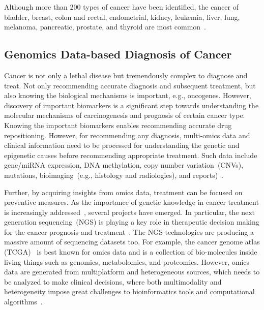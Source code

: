 \hspace*{3.5mm} Although more than 200 types of cancer have been identified, the cancer of bladder, breast, colon and rectal, endometrial, kidney, leukemia, liver, lung, melanoma, pancreatic, prostate, and thyroid are most common~\cite{71Torre}. 

\subsection{Genomics Data-based Diagnosis of Cancer}
\hspace*{3.5mm} Cancer is not only a lethal disease but tremendously complex to diagnose and treat. Not only recommending accurate diagnosis and subsequent treatment, but also knowing the biological mechanisms is important, e.g., oncogenes. However, discovery of important biomarkers is a significant step towards understanding the molecular mechanisms of carcinogenesis and prognosis of certain cancer type. Knowing the important biomarkers enables recommending accurate drug repositioning. However, for recommending any diagnosis, multi-omics data and clinical information need to be processed for understanding the genetic and epigenetic causes before recommending appropriate treatment. Such data include gene/miRNA expression, DNA methylation, copy number variation~(CNVs), mutations, bioimaging~(e.g., histology and radiologies), and reports)~\cite{22Ding, 23Zheng}.  

\hspace*{3.5mm} Further, by acquiring insights from omics data, treatment can be focused on preventive measures. As the importance of genetic knowledge in cancer treatment is increasingly addressed~\cite{15Wu}, several projects have emerged. In particular, the next generation sequencing~(NGS) is playing a key role in therapeutic decision making for the cancer prognosis and treatment~\cite{jha2017towards}. The NGS technologies are producing a massive amount of sequencing datasets too. For example, the cancer genome atlas (TCGA)~\cite{tomczak2015cancer} is best known for omics data and is a collection of bio-molecules inside living things such as genomics, metabolomics, and proteomics. However, omics data are generated from multiplatform and heterogeneous sources, which needs to be analyzed to make clinical decisions, where both multimodality and heterogeneity impose great challenges to bioinformatics tools and computational algorithms~\cite{karimACCESS2019,karimBIB2019}. 


